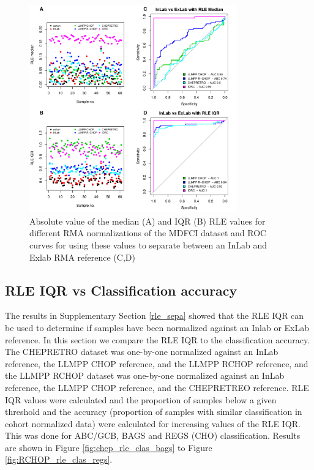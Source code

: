 \begin{figure}[!h]
	\begin{center}
		\includegraphics[width=0.8\textwidth]{figures/MDFCI_rle.pdf}
	\end{center}
	\caption{Absolute value of the median (A) and IQR (B) RLE values for different RMA normalizations of the MDFCI dataset and ROC curves for using these values to separate between an InLab and Exlab RMA reference (C,D)}
	\label{fig:mdfci_rle}
\end{figure}



\subsection{RLE IQR vs Classification accuracy}
The results in Supplementary Section \ref{rle_sepa} showed that the RLE IQR can be used to determine if samples have been normalized against an Inlab or ExLab reference. In this section we compare the RLE IQR to the classification accuracy. The CHEPRETRO dataset was one-by-one normalized against an InLab reference, the LLMPP CHOP reference, and the LLMPP RCHOP reference, and the LLMPP RCHOP dataset was one-by-one normalized against an InLab reference, the LLMPP CHOP reference, and the CHEPRETREO reference. RLE IQR values were calculated and the proportion of samples below a given threshold and the accuracy (proportion of samples with similar classification in cohort normalized data) were calculated for increasing values of the RLE IQR. This was done for ABC/GCB, BAGS and REGS (CHO) classification. Results are shown in Figure \ref{fig:chep_rle_clas_bags} to Figure \ref{fig:RCHOP_rle_clas_regs}. 

